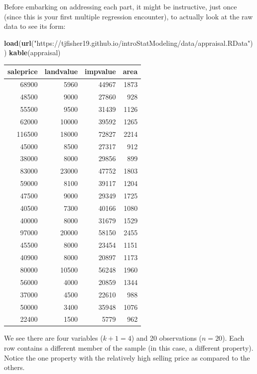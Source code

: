 \documentclass[
]{book}
\newenvironment{Shaded}{\begin{snugshade}}{\end{snugshade}}
\newcommand{\FunctionTok}[1]{\textcolor[rgb]{0.13,0.29,0.53}{\textbf{#1}}}
\newcommand{\NormalTok}[1]{#1}
\newcommand{\StringTok}[1]{\textcolor[rgb]{0.31,0.60,0.02}{#1}}
\begin{document}
Before embarking on addressing each part, it might be instructive, just once (since this is your first multiple regression encounter), to actually look at the raw data to see its form:

\begin{Shaded}
\begin{Highlighting}[]
\FunctionTok{load}\NormalTok{(}\FunctionTok{url}\NormalTok{(}\StringTok{"https://tjfisher19.github.io/introStatModeling/data/appraisal.RData"}\NormalTok{))}
\FunctionTok{kable}\NormalTok{(appraisal)}
\end{Highlighting}
\end{Shaded}

\begin{tabular}{r|r|r|r}
\hline
saleprice & landvalue & impvalue & area\\
\hline
68900 & 5960 & 44967 & 1873\\
\hline
48500 & 9000 & 27860 & 928\\
\hline
55500 & 9500 & 31439 & 1126\\
\hline
62000 & 10000 & 39592 & 1265\\
\hline
116500 & 18000 & 72827 & 2214\\
\hline
45000 & 8500 & 27317 & 912\\
\hline
38000 & 8000 & 29856 & 899\\
\hline
83000 & 23000 & 47752 & 1803\\
\hline
59000 & 8100 & 39117 & 1204\\
\hline
47500 & 9000 & 29349 & 1725\\
\hline
40500 & 7300 & 40166 & 1080\\
\hline
40000 & 8000 & 31679 & 1529\\
\hline
97000 & 20000 & 58150 & 2455\\
\hline
45500 & 8000 & 23454 & 1151\\
\hline
40900 & 8000 & 20897 & 1173\\
\hline
80000 & 10500 & 56248 & 1960\\
\hline
56000 & 4000 & 20859 & 1344\\
\hline
37000 & 4500 & 22610 & 988\\
\hline
50000 & 3400 & 35948 & 1076\\
\hline
22400 & 1500 & 5779 & 962\\
\hline
\end{tabular}

We see there are four variables (\(k+1 = 4\)) and 20 observations (\(n = 20\)).
Each row contains a different member of the sample (in this case, a different property).
Notice the one property with the relatively high selling price as compared to the others.
\end{document}
